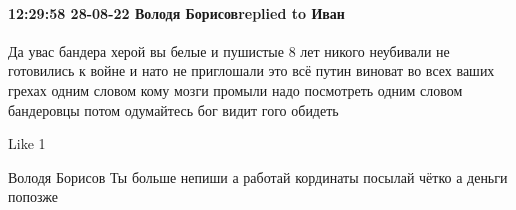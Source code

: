  
 
 
 
 

\paragraph{12:29:58 28-08-22 Володя Борисовreplied to Иван}

Да увас бандера херой вы белые и пушистые 8 лет никого неубивали не готовились
к войне и нато не приглошали это всё путин виноват во всех ваших грехах одним
словом кому мозги промыли надо посмотреть одним словом бандеровцы потом
одумайтесь бог видит гого обидеть

    Like 1

Володя Борисов
Ты больше непиши а работай кординаты посылай чётко а деньги попозже



